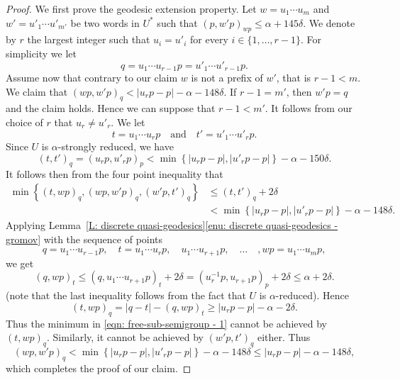 \begin{proof}
We first prove the geodesic extension property.
Let $w = u_1\cdots u_m$ and $w' = u'_1\cdots u'_{m'}$ be two words in $U^*$ such that $(p, w'p)_{wp} \leq \alpha +145\delta$.
We denote by $r$ the largest integer such that $u_i = u'_i$ for every $i \in \{1, \dots, r-1\}$.
For simplicity we let
\begin{equation*}
q = u_1\cdots u_{r-1} p = u'_1 \cdots u'_{r-1}p.
\end{equation*}
Assume now that contrary to our claim $w$ is not a prefix of $w'$, that is $r - 1 < m$.
We claim that $(wp, w'p)_q < |u_rp - p| - \alpha - 148\delta$.
If $r-1 = m'$, then $w'p = q$ and the claim holds.
Hence we can suppose that $r-1 < m'$.
It follows from our choice of $r$ that $u_r \neq u'_r$.
We let
\begin{equation*}
t = u_1\cdots u_rp
\quad \text{and} \quad
t' = u'_1 \cdots u'_rp.
\end{equation*}
Since $U$ is $\alpha$-strongly reduced, we have
\begin{equation*}
\left(t,t'\right)_q = (u_rp, u'_rp)_p < \min \left\{ |u_rp -p|, |u'_rp - p|\right\} - \alpha - 150\delta.
\end{equation*}
It follows then from the four point inequality that
\begin{equation} \label{eqn: free-sub-semigroup - 1}
\begin{split}
\min\left\{ (t,wp)_q, (wp,w'p)_q, (w'p,t')_q\right\} & \leq (t,t')_q +2\delta
\\& < \min \left\{ |u_rp -p|, |u'_rp - p|\right\} - \alpha - 148\delta.
\end{split}
\end{equation}
Applying Lemma~\ref{L: discrete quasi-geodesics}\eqref{enu: discrete quasi-geodesics - gromov} with the sequence of points
\begin{equation*}
q = u_1\cdots u_{r-1}p, \quad t = u_1\cdots u_rp, \quad u_1\cdots u_{r+1}p, \quad\dots\quad, wp = u_1\cdots u_mp,
\end{equation*}
we get
\begin{equation*}
(q,wp)_t \leq (q, u_1\cdots u_{r+1}p)_t + 2 \delta
= (u_r^{-1}p, u_{r+1}p)_p + 2 \delta
\leq \alpha + 2\delta.
\end{equation*}
(note that the last inequality follows from the fact that $U$ is $\alpha$-reduced).
Hence
\begin{equation*}
(t,wp)_q = |q-t| - (q,wp)_t \geq |u_rp - p| - \alpha - 2\delta.
\end{equation*}
Thus the minimum in \eqref{eqn: free-sub-semigroup - 1} cannot be achieved by $(t,wp)_q$.
Similarly, it cannot be achieved by $(w'p,t')_q$ either.
Thus
\begin{equation*}
\left(wp,w'p\right)_q < \min \left\{ |u_rp -p|, |u'_rp - p|\right\} - \alpha - 148\delta \leq |u_rp - p| - \alpha - 148\delta,
\end{equation*}
which completes the proof of our claim.


\end{proof}
